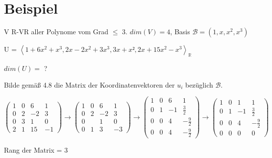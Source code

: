 \documentclass[a4paper, openany]{book}
\begin{document}
        \section{Beispiel}

        V R-VR aller Polynome vom Grad $\le$ 3. $dim(V) = 4$, Basis $\mathcal{B} = (1,x,x^2, x^3)$ 

        \begin{center}
          U = $\left \langle 1 + 6x^2 + x^3, 2x-2x^2 + 3x^3, 3x+x², 2x+15x^2-x^3 \right \rangle_{\mathbb{R}}$
        \end{center}

        $dim(U) =$ ?

        \par \medskip

        \par \medskip

        Bilde gemäß 4.8 die Matrix der Koordinatenvektoren der $u_i$ bezüglich $\mathcal{B}$.

        \par \medskip

        $\begin{pmatrix}1 & 0 & 6 & 1 \\ 0 & 2 & -2 & 3 \\ 0 & 3 & 1 & 0 \\ 2 & 1 & 15 & -1 \end{pmatrix} \rightarrow \begin{pmatrix}1 & 0 & 6 & 1 \\ 0 & 2 & -2 & 3 \\ 0 &  & 1 & 0 \\ 0 & 1 & 3 & -3 \end{pmatrix} \rightarrow \begin{pmatrix}1 & 0 & 6 & 1 \\ 0 & 1 & -1 & \frac{3}{2} \\ 0 & 0 & 4 & - \frac{9}{2} \\ 0 & 0 & 4 & - \frac{9}{2} \end{pmatrix} \rightarrow \begin{pmatrix}1 & 0 & 1 & 1 \\ 0 & 1 & -1 & \frac{3}{2} \\ 0 & 0 & 4 & - \frac{9}{2} \\ 0 & 0 & 0 & 0 \end{pmatrix}$

        \par \medskip
        
        Rang der Matrix = 3
\end{document}
